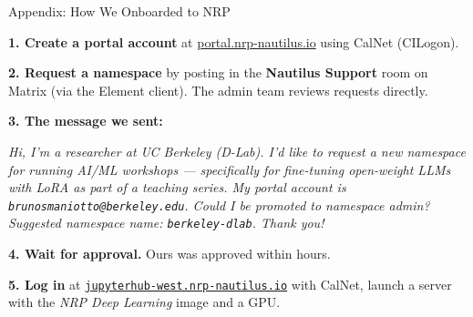 \documentclass[aspectratio=169]{beamer}
\begin{document}
\appendix

\begin{frame}{Appendix: How We Onboarded to NRP}
    \hypertarget{nrp-onboarding}{}

    \textbf{1. Create a portal account} at \href{https://portal.nrp-nautilus.io}{portal.nrp-nautilus.io} using CalNet (CILogon).

    \vspace{0.4em}
    \textbf{2. Request a namespace} by posting in the \textbf{Nautilus Support} room on Matrix (via the Element client). The admin team reviews requests directly.

    \vspace{0.4em}
    \textbf{3. The message we sent:}
    \begin{tcolorbox}[colback=gray!8, colframe=gray!40, boxrule=0.5pt, arc=2pt, fontupper=\small]
        \itshape
        Hi, I'm a researcher at UC Berkeley (D-Lab). I'd like to request a new namespace for running AI/ML workshops --- specifically for fine-tuning open-weight LLMs with LoRA as part of a teaching series. My portal account is \texttt{brunosmaniotto@berkeley.edu}. Could I be promoted to namespace admin? Suggested namespace name: \texttt{berkeley-dlab}. Thank you!
    \end{tcolorbox}

    \vspace{0.3em}
    \textbf{4. Wait for approval.} Ours was approved within hours.

    \vspace{0.4em}
    \textbf{5. Log in} at \href{https://jupyterhub-west.nrp-nautilus.io}{\texttt{jupyterhub-west.nrp-nautilus.io}} with CalNet, launch a server with the \textit{NRP Deep Learning} image and a GPU.

    \vspace{0.5em}
    \hfill\hyperlink{nrp-access}{}
\end{frame}
\end{document}
